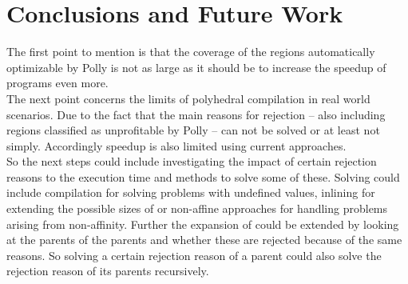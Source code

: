 \chapter{Conclusions and Future Work}
The first point to mention is that the coverage of the regions automatically optimizable by Polly is not as large as it should be to increase the speedup of programs even more.\\
The next point concerns the limits of polyhedral compilation in real world scenarios.
Due to the fact that the main reasons for rejection -- also including regions classified as unprofitable by Polly -- can not be solved or at least not simply.
Accordingly speedup is also limited using current approaches.\\
So the next steps could include investigating the impact of certain rejection reasons to the execution time and methods to solve some of these.
Solving could include \jit compilation for solving problems with undefined values, inlining for extending the possible sizes of \scops or non-affine approaches for handling problems arising from non-affinity.
Further the expansion of \scops could be extended by looking at the parents of the parents and whether these are rejected because of the same reasons.
So solving a certain rejection reason of a parent could also solve the rejection reason of its parents recursively.
